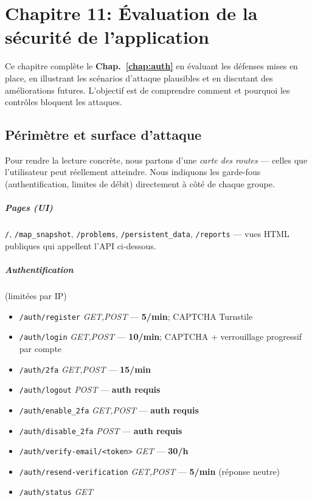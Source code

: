 \chapter{Chapitre 11: Évaluation de la sécurité de l'application}\label{chap:security}

\noindent Ce chapitre complète le \textbf{Chap.~\ref{chap:auth}} en évaluant les défenses mises en place, en illustrant les scénarios d'attaque plausibles et en discutant des améliorations futures. L'objectif est de comprendre comment et pourquoi les contrôles bloquent les attaques.

\section{Périmètre et surface d'attaque}
\noindent Pour rendre la lecture concrète, nous partons d'une \emph{carte des routes} — celles que l'utilisateur peut réellement atteindre. Nous indiquons les garde-fous (authentification, limites de débit) directement à côté de chaque groupe.

\paragraph{Pages (UI)} \texttt{/}, \texttt{/map\_snapshot}, \texttt{/problems}, \texttt{/persistent\_data}, \texttt{/reports} — vues HTML publiques qui appellent l'API ci-dessous.

\paragraph{Authentification} (limitées par IP)
\begin{itemize}
  \item \texttt{/auth/register} \textit{GET,POST} — \textbf{5/min}; CAPTCHA Turnstile
  \item \texttt{/auth/login} \textit{GET,POST} — \textbf{10/min}; CAPTCHA + verrouillage progressif par compte
  \item \texttt{/auth/2fa} \textit{GET,POST} — \textbf{15/min}
  \item \texttt{/auth/logout} \textit{POST} — \textbf{auth requis}
  \item \texttt{/auth/enable\_2fa} \textit{GET,POST} — \textbf{auth requis}
  \item \texttt{/auth/disable\_2fa} \textit{POST} — \textbf{auth requis}
  \item \texttt{/auth/verify-email/<token>} \textit{GET} — \textbf{30/h}
  \item \texttt{/auth/resend-verification} \textit{GET,POST} — \textbf{5/min} (réponse neutre)
  \item \texttt{/auth/status} \textit{GET}
\end{itemize}

